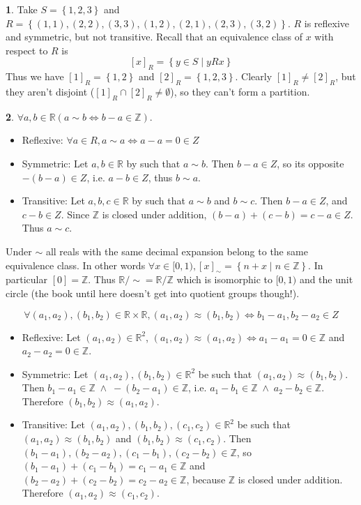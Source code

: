 \documentclass{article}
\theoremstyle{definition}
\newcommand{\bb}[1]{\mathbb{#1}}
\newcommand{\Z}{\bb{Z}}
\newcommand{\R}{\bb{R}}
\newcommand{\AND}{\;\wedge\;}
\newcommand{\set}[1]{\left\{#1\right\}}
\newcommand{\bra}[1]{\left[#1\right]}
\newcommand{\ec}[2][\sim]{{\left[#2\right]}_{#1}}
\theoremstyle{definition}
\theoremstyle{definition}
\newtheorem{solution-internal}{}[subsection]
\newenvironment{solution}{
  \medskip
  \begin{solution-internal}
}{
  \end{solution-internal}
}
\begin{document}
\begin{solution}
Take $S = \set{1,2,3}$ and $R = \set{(1,1), (2,2), (3,3), (1,2), (2,1),
(2,3), (3,2)}$. $R$ is reflexive and symmetric, but not transitive. Recall that
an equivalence class of $x$ with respect to $R$ is
\[ \ec[R]{x} = \set{y \in S \mid yRx} \]
Thus we have $\ec[R]{1} = \set{1,2}$ and $\ec[R]{2} = \set{1,2,3}$. Clearly
$\ec[R]{1} \neq \ec[R]{2}$, but they aren't disjoint ($\ec[R]{1} \cap \ec[R]{2}
\neq \emptyset$), so they can't form a partition.
\end{solution}

\begin{solution}
$\forall a, b \in \R (a \sim b \iff b - a \in \Z)$.
\begin{itemize}
\item Reflexive: $\forall a \in R, a \sim a \iff a - a = 0 \in Z$
\item Symmetric: Let $a,b \in \R$ by such that $a \sim b$. Then $b - a \in Z$, so its opposite $-(b-a) \in Z$, i.e. $a-b \in Z$, thus $b \sim a$.
\item Transitive: Let $a, b, c \in \R$ by such that $a \sim b$ and $b \sim c$. Then $b - a \in Z$, and $c - b \in Z$. Since $\Z$ is closed under addition, $(b-a) + (c-b) = c - a \in Z$. Thus $a \sim c$.
\end{itemize}
Under $\sim$ all reals with the same decimal expansion belong to the same
equivalence class. In other words $\forall x \in [0,1), \ec{x} = \set{n + x \mid n \in \Z}$.
In particular $\bra{0} = \Z$. Thus $\R/\sim = \R/\Z$ which is isomorphic to
$[0,1)$ and the unit circle (the book until here doesn't get into quotient
groups though!).

\[ \forall (a_1, a_2), (b_1, b_2) \in \R \times \R, (a_1, a_2) \approx (b_1, b_2) \iff b_1 - a_1, b_2 - a_2 \in Z \]

\begin{itemize}
\item Reflexive: Let $(a_1, a_2) \in \R^2$, $(a_1, a_2) \approx (a_1, a_2) \iff a_1 - a_1 = 0 \in \Z$ and $a_2 - a_2 = 0 \in \Z$.
\item Symmetric: Let $(a_1, a_2), (b_1, b_2) \in \R^2$ be such that $(a_1, a_2) \approx (b_1, b_2)$.
Then $b_1 - a_1 \in \Z \AND -(b_2 - a_1) \in \Z$, i.e.  $a_1 -b_1 \in \Z \AND a_2 - b_2 \in \Z$.
Therefore $(b_1, b_2) \approx (a_1, a_2)$.
\item Transitive: Let $(a_1, a_2), (b_1, b_2), (c_1, c_2) \in \R^2$ be such that $(a_1, a_2) \approx (b_1, b_2)$ and $(b_1, b_2) \approx (c_1, c_2)$. Then $(b_1 - a_1), (b_2 - a_2), (c_1 - b_1), (c_2 - b_2) \in \Z$, so $(b_1 - a_1) + (c_1 - b_1) = c_1 - a_1 \in \Z$ and $(b_2 - a_2) + (c_2 - b_2) = c_2 - a_2 \in \Z$, because $\Z$ is closed under addition. Therefore $(a_1, a_2) \approx (c_1, c_2)$.
\end{itemize}
\end{solution}
\end{document}
